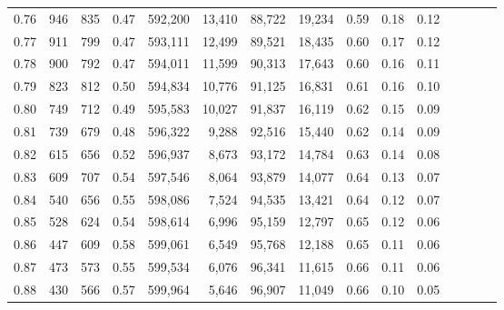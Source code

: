 \begin{tabular}{rrrcrrrrrrrrrrr}
0.76 &     946 &    835 &                                       0.47 &  592,200 &   13,410 &   88,722 &   19,234 &  0.59 &  0.18 &                         0.12 \\
0.77 &     911 &    799 &                                       0.47 &  593,111 &   12,499 &   89,521 &   18,435 &  0.60 &  0.17 &                         0.12 \\
0.78 &     900 &    792 &                                       0.47 &  594,011 &   11,599 &   90,313 &   17,643 &  0.60 &  0.16 &                         0.11 \\
0.79 &     823 &    812 &                                       0.50 &  594,834 &   10,776 &   91,125 &   16,831 &  0.61 &  0.16 &                         0.10 \\
0.80 &     749 &    712 &                                       0.49 &  595,583 &   10,027 &   91,837 &   16,119 &  0.62 &  0.15 &                         0.09 \\
0.81 &     739 &    679 &                                       0.48 &  596,322 &    9,288 &   92,516 &   15,440 &  0.62 &  0.14 &                         0.09 \\
0.82 &     615 &    656 &                                       0.52 &  596,937 &    8,673 &   93,172 &   14,784 &  0.63 &  0.14 &                         0.08 \\
0.83 &     609 &    707 &                                       0.54 &  597,546 &    8,064 &   93,879 &   14,077 &  0.64 &  0.13 &                         0.07 \\
0.84 &     540 &    656 &                                       0.55 &  598,086 &    7,524 &   94,535 &   13,421 &  0.64 &  0.12 &                         0.07 \\
0.85 &     528 &    624 &                                       0.54 &  598,614 &    6,996 &   95,159 &   12,797 &  0.65 &  0.12 &                         0.06 \\
0.86 &     447 &    609 &                                       0.58 &  599,061 &    6,549 &   95,768 &   12,188 &  0.65 &  0.11 &                         0.06 \\
0.87 &     473 &    573 &                                       0.55 &  599,534 &    6,076 &   96,341 &   11,615 &  0.66 &  0.11 &                         0.06 \\
0.88 &     430 &    566 &                                       0.57 &  599,964 &    5,646 &   96,907 &   11,049 &  0.66 &  0.10 &                         0.05 \\

\end{tabular}
